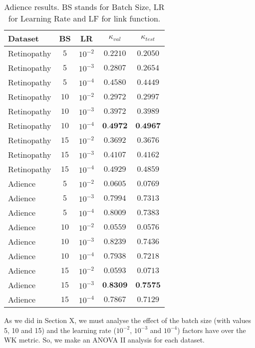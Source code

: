 \documentclass[10pt, a4paper, titlepage, twocolumn]{article}
\begin{document}
	\begin{table}[ht]
		\footnotesize
		\centering
		\begin{tabular}{lcc|cc}
			Dataset & BS & LR & $\kappa_{val}$ & $\kappa_{test}$\\\hline\addlinespace[0.05cm]
			Retinopathy & $5$ & $10^{-2}$ & $0.2210$ & $0.2050$\\
			Retinopathy & $5$ & $10^{-3}$ & $0.2807$ & $0.2654$\\
			Retinopathy & $5$ & $10^{-4}$ & $0.4580$ & $0.4449$\\
			
			Retinopathy & $10$ & $10^{-2}$ & $0.2972$ & $0.2997$\\
			Retinopathy & $10$ & $10^{-3}$ & $0.3972$ & $0.3989$\\
			Retinopathy & $10$ & $10^{-4}$ & $\textbf{0.4972}$ & $\textbf{0.4967}$\\
			
			Retinopathy & $15$ & $10^{-2}$ & $0.3692$ & $0.3676$\\
			Retinopathy & $15$ & $10^{-3}$ & $0.4107$ & $0.4162$\\
			Retinopathy & $15$ & $10^{-4}$ & $0.4929$ & $0.4859$\\
			\hline\addlinespace[0.05cm]
			Adience & $5$ & $10^{-2}$ & $0.0605$ & $0.0769$\\
			Adience & $5$ & $10^{-3}$ & $0.7994$ & $0.7313$\\
			Adience & $5$ & $10^{-4}$ & $0.8009$ & $0.7383$\\
			
			Adience & $10$ & $10^{-2}$ & $0.0559$ & $0.0576$\\
			Adience & $10$ & $10^{-3}$ & $0.8239$ & $0.7436$\\
			Adience & $10$ & $10^{-4}$ & $0.7938$ & $0.7218$\\
			
			Adience & $15$ & $10^{-2}$ & $0.0593$ & $0.0713$\\
			Adience & $15$ & $10^{-3}$ & $\textbf{0.8309}$ & $\textbf{0.7575}$\\
			Adience & $15$ & $10^{-4}$ & $0.7867$ & $0.7129$\\
		\end{tabular}
		\caption{Adience results. BS stands for Batch Size, LR for Learning Rate and LF for link function.}
		\label{table:NominalResults}
	\end{table}
	
	As we did in Section X, we must analyse the effect of the batch size (with values 5, 10 and 15) and the learning rate ($10^{-2}$, $10^{-3}$ and $10^{-4}$) factors have over the WK metric. So, we make an ANOVA II analysis for each dataset.
	
\end{document}
